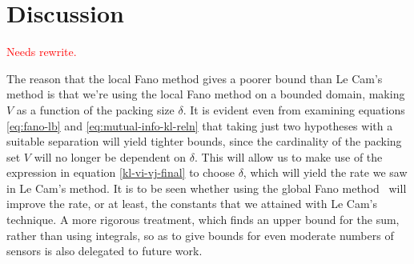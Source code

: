 \documentclass[conference]{IEEEtran}
\begin{document}
\section{Discussion}
\label{sec:discussion}

\textcolor{red}{Needs rewrite.}

The reason that the local Fano method gives a poorer bound than Le Cam's method
is that we're using the local Fano method on a bounded domain, making $V$ as a
function of the packing size $\delta$.  It is evident even from examining
equations \eqref{eq:fano-lb} and \eqref{eq:mutual-info-kl-reln} that taking
just two hypotheses with a suitable separation will yield tighter bounds, since
the cardinality of the packing set $V$ will no longer be dependent on $\delta$.
This will allow us to make use of the expression in equation
\eqref{kl-vi-vj-final} to choose $\delta$, which will yield the rate we saw in
Le Cam's method. It is to be seen whether using the global Fano
method~\cite{Duchi2015Information} will improve the rate, or at least, the
constants that we attained with Le Cam's technique. A more rigorous treatment,
which finds an upper bound for the sum, rather than using integrals, so as to
give bounds for even moderate numbers of sensors is also delegated to future
work.




\end{document}
